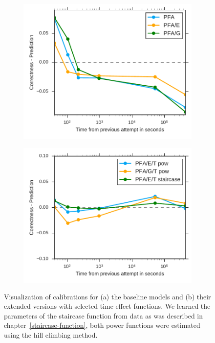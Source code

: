\begin{figure}[htbp]
  \centering
  \begin{subfigure}{.49\textwidth}
    \centering
    \includegraphics[width=\textwidth]{img/calibration-time-effect-off}
    \caption{}
    \label{fig:calibration-time-effect-off}
  \end{subfigure}
  \begin{subfigure}{.49\textwidth}
    \centering
    \includegraphics[width=\textwidth]{img/calibration-time-effect-on}
    \caption{}
    \label{fig:calibration-time-effect-on}
  \end{subfigure}
  \caption{Visualization of calibrations for (a) the baseline models and (b) their extended versions with selected time effect functions. We learned the parameters of the staircase function from data as was described in chapter~\ref{staircase-function}, both power functions were estimated using the hill climbing method.}
  \label{fig:calibration1}
\end{figure}

